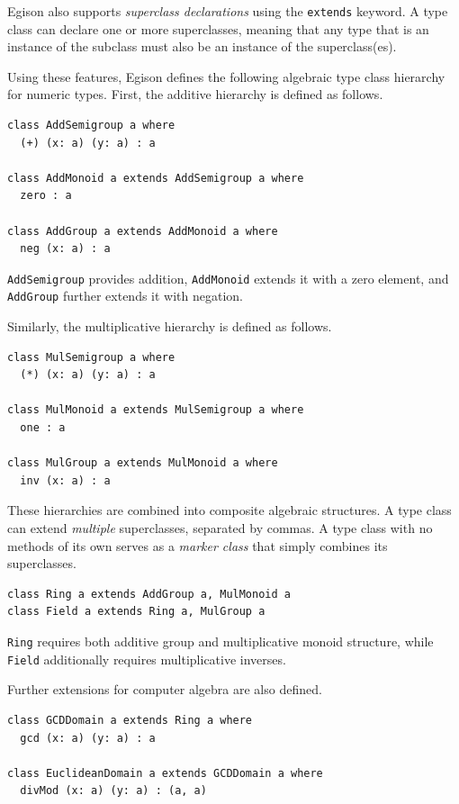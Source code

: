 Egison also supports \emph{superclass declarations} using the \lstinline{extends} keyword.
A type class can declare one or more superclasses, meaning that any type that is an instance of the subclass must also be an instance of the superclass(es).

Using these features, Egison defines the following algebraic type class hierarchy for numeric types.
First, the additive hierarchy is defined as follows.
\begin{lstlisting}[language=egison,numbers=none]
class AddSemigroup a where
  (+) (x: a) (y: a) : a

class AddMonoid a extends AddSemigroup a where
  zero : a

class AddGroup a extends AddMonoid a where
  neg (x: a) : a
\end{lstlisting}
\lstinline{AddSemigroup} provides addition, \lstinline{AddMonoid} extends it with a zero element, and \lstinline{AddGroup} further extends it with negation.

Similarly, the multiplicative hierarchy is defined as follows.
\begin{lstlisting}[language=egison,numbers=none]
class MulSemigroup a where
  (*) (x: a) (y: a) : a

class MulMonoid a extends MulSemigroup a where
  one : a

class MulGroup a extends MulMonoid a where
  inv (x: a) : a
\end{lstlisting}

These hierarchies are combined into composite algebraic structures.
A type class can extend \emph{multiple} superclasses, separated by commas.
A type class with no methods of its own serves as a \emph{marker class} that simply combines its superclasses.
\begin{lstlisting}[language=egison,numbers=none]
class Ring a extends AddGroup a, MulMonoid a
class Field a extends Ring a, MulGroup a
\end{lstlisting}
\lstinline{Ring} requires both additive group and multiplicative monoid structure, while \lstinline{Field} additionally requires multiplicative inverses.

Further extensions for computer algebra are also defined.
\begin{lstlisting}[language=egison,numbers=none]
class GCDDomain a extends Ring a where
  gcd (x: a) (y: a) : a

class EuclideanDomain a extends GCDDomain a where
  divMod (x: a) (y: a) : (a, a)
\end{lstlisting}

